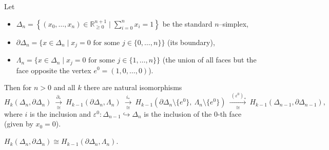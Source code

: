 \begin{lemma}\label{lem 2.2}
Let 
\begin{itemize}
    \item $\Delta_n=\left\{(x_0,\dots,x_n)\in\mathbb{R}^{n+1}_{\geq 0}\mid \sum_{i=0}^n x_i=1\right\}$ be the standard $n$–simplex,

    \item $\partial \Delta_n=\{x\in\Delta_n\mid x_j=0 \text{ for some } j\in\{0,\dots,n\}\}$ (its boundary),
    
    \item $\Lambda_n=\{x\in\Delta_n\mid x_j=0 \text{ for some } j\in\{1,\dots,n\}\}$ (the union of all faces but the face opposite the vertex $e^0=(1,0,\dots,0)$).
\end{itemize}
Then for $n>0$ and all $k$ there are natural isomorphisms
\[
H_k(\Delta_n,\partial \Delta_n)\ \xrightarrow[\cong]{\ \partial_*\ }\ 
H_{k-1}(\partial \Delta_n,\Lambda_n)\ \xrightarrow[\cong]{\ i_*\ }\ 
H_{k-1}(\partial \Delta_n\setminus\{e^0\},\ \Lambda_n\setminus\{e^0\})
\ \xrightarrow[\cong]{\ (\varepsilon^0)_* }\ 
H_{k-1}(\Delta_{n-1},\partial \Delta_{n-1}),
\]
where $i$ is the inclusion and $\varepsilon^0:\Delta_{n-1}\hookrightarrow \Delta_n$ is the inclusion of the $0$-th face (given by $x_0=0$).
\end{lemma}

\begin{proposition}\label{prop 2.3}
$H_k(\Delta_n,\partial \Delta_n)\cong H_{k-1}(\partial \Delta_n,\Lambda_n)$.
\end{proposition}


